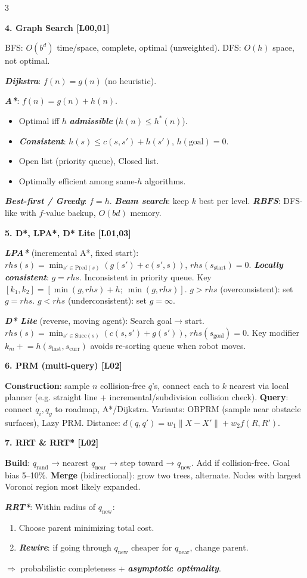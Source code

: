 \documentclass[8pt,a4paper,landscape]{extarticle}
\newcommand{\sect}[1]{\vspace{1pt}\colorbox{black!10}{\parbox{\linewidth}{\textbf{\footnotesize #1}}}\vspace{1pt}}
\newcommand{\sub}[1]{\textbf{\textit{#1}}}
\begin{document}
\begin{multicols*}{3}
\sect{4. Graph Search \hfill {\scriptsize[L00,01]}}
BFS: $O(b^d)$ time/space, complete, optimal (unweighted). DFS: $O(h)$ space, not optimal.

\sub{Dijkstra}: $f(n)=g(n)$ (no heuristic).

\sub{A*}: $f(n)=g(n)+h(n)$.
\begin{itemize}
\item Optimal iff $h$ \sub{admissible} ($h(n)\le h^*(n)$).
\item \sub{Consistent}: $h(s)\le c(s,s')+h(s')$, $h(\text{goal})=0$.
\item Open list (priority queue), Closed list.
\item Optimally efficient among same-$h$ algorithms.
\end{itemize}

\sub{Best-first / Greedy}: $f=h$. \sub{Beam search}: keep $k$ best per level. \sub{RBFS}: DFS-like with $f$-value backup, $O(bd)$ memory.

\sect{5. D*, LPA*, D* Lite \hfill {\scriptsize[L01,03]}}
\sub{LPA*} (incremental A*, fixed start):
$rhs(s)=\min_{s'\in\text{Pred}(s)}(g(s')+c(s',s))$, $rhs(s_{\text{start}})=0$.
\sub{Locally consistent}: $g=rhs$. Inconsistent in priority queue.
Key $[k_1,k_2]=[\min(g,rhs)+h;\ \min(g,rhs)]$.
$g>rhs$ (overconsistent): set $g=rhs$.
$g<rhs$ (underconsistent): set $g=\infty$.

\sub{D* Lite} (reverse, moving agent):
Search goal$\to$start. $rhs(s)=\min_{s'\in\text{Succ}(s)}(c(s,s')+g(s'))$, $rhs(s_{\text{goal}})=0$.
Key modifier $k_m\mathrel{+}=h(s_{\text{last}},s_{\text{curr}})$ avoids re-sorting queue when robot moves.

\sect{6. PRM (multi-query) \hfill {\scriptsize[L02]}}
\textbf{Construction}: sample $n$ collision-free $q$'s, connect each to $k$ nearest via local planner (e.g. straight line + incremental/subdivision collision check). \textbf{Query}: connect $q_i,q_g$ to roadmap, A*/Dijkstra.
Variants: OBPRM (sample near obstacle surfaces), Lazy PRM.
Distance: $d(q,q')=w_1\|X-X'\|+w_2 f(R,R')$.

\sect{7. RRT \& RRT* \hfill {\scriptsize[L02]}}
\textbf{Build}: $q_{\text{rand}}$ → nearest $q_{\text{near}}$ → step toward → $q_{\text{new}}$. Add if collision-free. Goal bias 5–10\%.
\textbf{Merge} (bidirectional): grow two trees, alternate.
Nodes with largest Voronoi region most likely expanded.

\sub{RRT*}: Within radius of $q_{\text{new}}$:
\begin{enumerate}
\item Choose parent minimizing total cost.
\item \sub{Rewire}: if going through $q_{\text{new}}$ cheaper for $q_{\text{near}}$, change parent.
\end{enumerate}
$\Rightarrow$ probabilistic completeness + \sub{asymptotic optimality}.


\end{multicols*}
\end{document}
